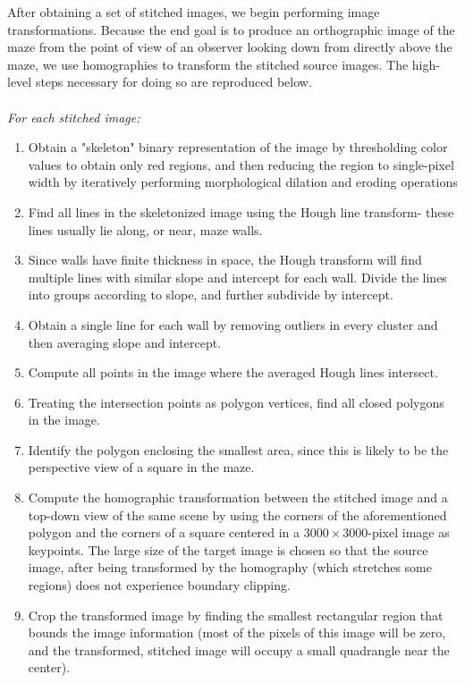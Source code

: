 \documentclass[10pt,twocolumn,letterpaper]{article}
\begin{document}
After obtaining a set of stitched images, we begin performing image transformations.  Because the end goal is to produce
an orthographic image of the maze from the point of view of an observer looking down from directly above the maze, we
use homographies to transform the stitched source images.  The high-level steps necessary for doing so are reproduced
below.
\\
\\
\textit{For each stitched image:}
\begin{enumerate}
	\item Obtain a "skeleton" binary representation of the image by thresholding color values to obtain only red
	regions, and then reducing the region to single-pixel width by iteratively performing morphological dilation and
	eroding operations
	\item Find all lines in the skeletonized image using the Hough line transform- these lines usually lie along, or
	near, maze walls.
	\item Since walls have finite thickness in space, the Hough transform will find multiple lines with similar slope
	and intercept for each wall.  Divide the lines into groups according to slope, and further subdivide by intercept.
	\item Obtain a single line for each wall by removing outliers in every cluster and then averaging slope and
	intercept.
	\item Compute all points in the image where the averaged Hough lines intersect.
	\item Treating the intersection points as polygon vertices, find all closed polygons in the image.
	\item Identify the polygon enclosing the smallest area, since this is likely to be the perspective view of a square
	in the maze.
	\item Compute the homographic transformation between the stitched image and a top-down view of the same scene by
	using the corners of the aforementioned polygon and the corners of a square centered in a $3000\times 3000$-pixel
	image as keypoints.  The large size of the target image is chosen so that the source image, after being transformed
	by the homography (which stretches some regions) does not experience boundary clipping.
	\item Crop the transformed image by finding the smallest rectangular region that bounds the image information (most
	of the pixels of this image will be zero, and the transformed, stitched image will occupy a small quadrangle near
	the center).
\end{enumerate}
\end{document}

